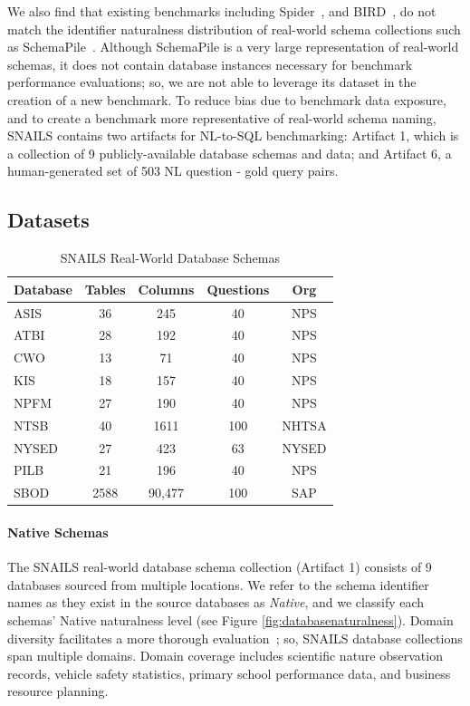 We also find that existing benchmarks including Spider~\cite{Yu&al.18c}, and BIRD~\cite{li2023llm}, do not match the identifier naturalness distribution of real-world schema collections such as SchemaPile~\cite{doehmen2024schemapile}.
Although SchemaPile is a very large representation of real-world schemas, it does not contain database instances necessary for benchmark performance evaluations; so, we are not able to leverage its dataset in the creation of a new benchmark.
To reduce bias due to benchmark data exposure, and to create a benchmark more representative of real-world schema naming, SNAILS contains two artifacts for NL-to-SQL benchmarking: Artifact 1, which is a collection of 9 publicly-available database schemas and data; and Artifact 6, a human-generated set of 503 NL question - gold query pairs.

\subsection{Datasets}
\label{subsection:benchmark-datasets}

\begin{table}[t]
  \centering
  \begin{tabular}{|p{2cm}|c|c|c|c|}
  \hline
  \textbf{Database} & \textbf{Tables} & \textbf{Columns} & \textbf{Questions} & \textbf{Org} \\
  \hline
  ASIS & 36 & 245 & 40 & NPS \\
  ATBI & 28 & 192 & 40 & NPS \\
  CWO & 13 & 71 & 40 & NPS \\
  KIS & 18 & 157 & 40 & NPS \\
  NPFM & 27 & 190 & 40 & NPS \\
  NTSB & 40 & 1611 & 100 & NHTSA \\
  NYSED & 27 & 423 & 63 & NYSED \\
  PILB & 21 & 196 & 40 & NPS \\
  SBOD & 2588 & 90,477 & 100 & SAP \\
  \hline
  \end{tabular}
  \caption{SNAILS Real-World Database Schemas}
  \label{table:benchmarkschemas}
\end{table}

\paragraph{\textbf{Native Schemas}}
The SNAILS real-world database schema collection (Artifact 1) consists of 9 databases sourced from multiple locations.
We refer to the schema identifier names as they exist in the source databases as \emph{Native}, and we classify each schemas' Native naturalness level (see Figure \ref{fig:databasenaturalness}).
Domain diversity facilitates a more thorough evaluation~\cite{finegan-dollak-etal-2018-improving}; so, SNAILS database collections span multiple domains.
Domain coverage includes scientific nature observation records, vehicle safety statistics, primary school performance data, and business resource planning.

